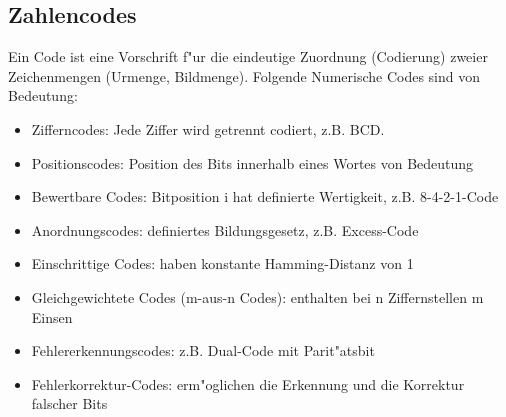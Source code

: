 \subsection{Zahlencodes}
Ein Code ist eine Vorschrift f"ur die eindeutige Zuordnung (Codierung) zweier Zeichenmengen (Urmenge, Bildmenge).
Folgende Numerische Codes sind von Bedeutung:
\begin{itemize}
	\item Zifferncodes: Jede Ziffer wird getrennt codiert, z.B. BCD.
	\item Positionscodes: Position des Bits innerhalb eines Wortes von Bedeutung
	\item Bewertbare Codes: Bitposition i hat definierte Wertigkeit, z.B. 8-4-2-1-Code
	\item Anordnungscodes: definiertes Bildungsgesetz, z.B. Excess-Code
	\item Einschrittige Codes: haben konstante Hamming-Distanz von 1
	\item Gleichgewichtete Codes (m-aus-n Codes): enthalten bei n Ziffernstellen m Einsen
	\item Fehlererkennungscodes: z.B. Dual-Code mit Parit"atsbit
	\item Fehlerkorrektur-Codes: erm"oglichen die Erkennung und die Korrektur falscher Bits
\end{itemize}

